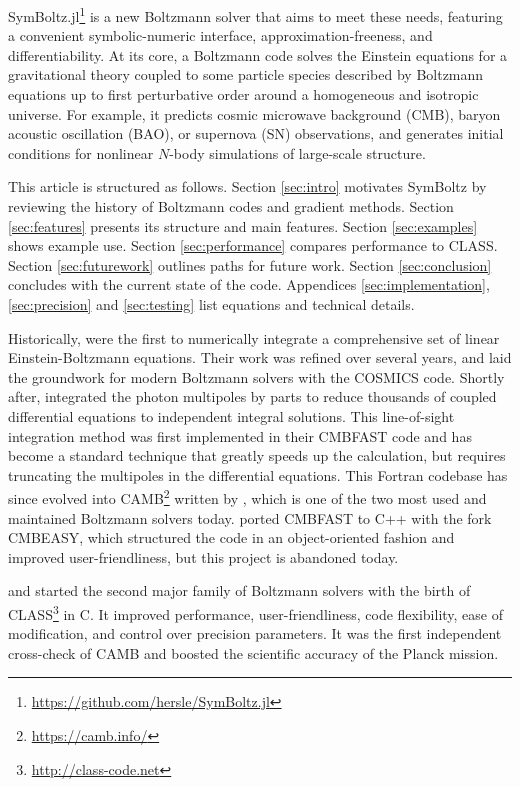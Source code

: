 \documentclass{aa}
\begin{document}
SymBoltz.jl\footnote{\url{https://github.com/hersle/SymBoltz.jl}} is a new Boltzmann solver that aims to meet these needs, featuring a convenient symbolic-numeric interface, approximation-freeness, and differentiability.
At its core, a Boltzmann code solves the Einstein equations for a gravitational theory coupled to some particle species described by Boltzmann equations up to first perturbative order around a homogeneous and isotropic universe.
For example, it predicts cosmic microwave background (CMB), baryon acoustic oscillation (BAO), or supernova (SN) observations, and generates initial conditions for nonlinear $N$-body simulations of large-scale structure.

This article is structured as follows.
Section \ref{sec:intro} motivates SymBoltz by reviewing the history of Boltzmann codes and gradient methods.
Section \ref{sec:features} presents its structure and main features.
Section \ref{sec:examples} shows example use.
Section \ref{sec:performance} compares performance to CLASS.
Section \ref{sec:futurework} outlines paths for future work.
Section \ref{sec:conclusion} concludes with the current state of the code.
Appendices \ref{sec:implementation}, \ref{sec:precision} and \ref{sec:testing} list equations and technical details.

Historically, \citet{peeblesPrimevalAdiabaticPerturbation1970} were the first to numerically integrate a comprehensive set of linear Einstein-Boltzmann equations.
Their work was refined over several years, and \citet{maCosmologicalPerturbationTheory1995} laid the groundwork for modern Boltzmann solvers with the COSMICS code.
Shortly after, \citet{seljakLineSightApproach1996} integrated the photon multipoles by parts to reduce thousands of coupled differential equations to independent integral solutions.
This line-of-sight integration method was first implemented in their CMBFAST code and has become a standard technique that greatly speeds up the calculation, but requires truncating the multipoles in the differential equations.
This Fortran codebase has since evolved into CAMB\footnote{\url{https://camb.info/}} written by \citet{lewisEfficientComputationCMB2000a}, which is one of the two most used and maintained Boltzmann solvers today.
\citet{doranCMBEASYObjectOriented2005} ported CMBFAST to C++ with the fork CMBEASY, which structured the code in an object-oriented fashion and improved user-friendliness, but this project is abandoned today.

\citet{lesgourguesCosmicLinearAnisotropy2011} and \citet{blasCosmicLinearAnisotropy2011a} started the second major family of Boltzmann solvers with the birth of CLASS\footnote{\url{http://class-code.net}} in C.
It improved performance, user-friendliness, code flexibility, ease of modification, and control over precision parameters.
It was the first independent cross-check of CAMB and boosted the scientific accuracy of the Planck mission.
\end{document}
